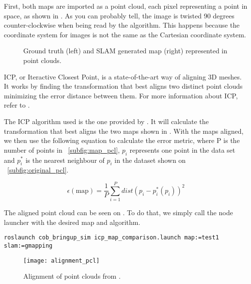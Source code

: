 First, both maps are imported as a point cloud, each pixel representing a point in space, as shown in . As you can probably tell, the image is twisted 90 degrees counter-clockwise when being read by the algorithm. This happens because the coordinate system for images is not the same as the Cartesian coordinate system.

\begin{figure}[!ht]
     \centering
     \hspace{0cm}
     \caption{Ground truth (left) and SLAM generated map (right) represented in point clouds.}
     \label{fig:point_cloud}
\end{figure}

ICP, or Iteractive Closest Point, is a state-of-the-art way of aligning 3D meshes. It works by finding the transformation that best aligns two distinct point clouds minimizing the error distance between them. For more information about ICP, refer to \citeauthor{besl1992method}.

The ICP algorithm used is the one provided by \citeauthor{flannigan2019}. It will calculate the transformation that best aligns the two maps shown in . With the maps aligned, we then use the following equation to calculate the error metric, where P is the number of points in \figurename~\ref{subfig:map_pcl}, $p_i$ represents one point in the data set and $p_i^*$ is the nearest neighbour of $p_i$ in the dataset shown on \figurename~\ref{subfig:original_pcl}.

\begin{equation}
\epsilon(\text{map}) = \frac{1}{P} \sum_{i=1}^P dist(p_i - p_i^*(p_i))^2
\end{equation}

The aligned point cloud can be seen on . To do that, we simply call the node launcher with the desired map and algorithm.

\begin{verbatim}
roslaunch cob_bringup_sim icp_map_comparison.launch map:=test1 slam:=gmapping
\end{verbatim}

\begin{figure}[!ht]
    \centering
    \texttt{[image: alignment\_pcl]}
    \caption{Alignment of point clouds from .}
    \label{fig:alignment_pcl}
\end{figure}


